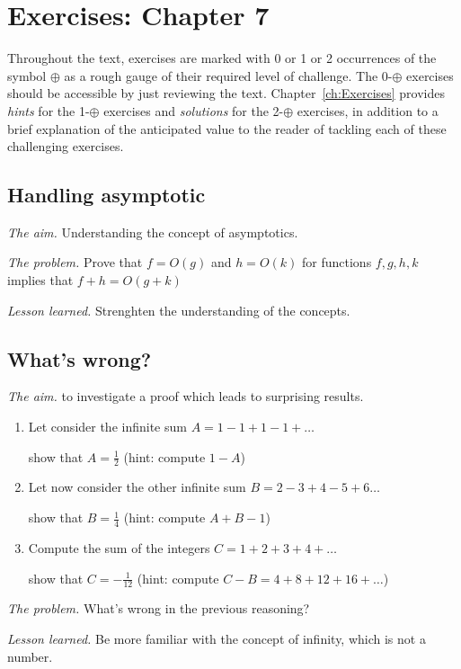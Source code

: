 
\section{Exercises: Chapter 7}

Throughout the text, exercises are marked with 0 or 1 or 2 occurrences
of the symbol $\oplus$ as a rough gauge of their required level of
 challenge.  The 0-$\oplus$ exercises should be accessible by just reviewing the text.
Chapter~\ref{ch:Exercises} provides {\em hints} for the 1-$\oplus$ exercises
and {\em solutions} for the 2-$\oplus$ exercises, in addition to a brief
explanation of the anticipated value to the reader of tackling each of these
challenging exercises.


\subsection{Handling asymptotic}

\noindent \textit{The aim.}
Understanding the concept of asymptotics.
\medskip

\noindent \textit{The problem.}
Prove that $f = O(g)$ and $h = O(k)$ for functions $f,g,h,k$ implies that
$f+h = O(g+k)$
\medskip

\noindent \textit{Lesson learned.}
Strenghten the understanding of the concepts. 


\subsection{What's wrong?}

\noindent \textit{The aim.}
to investigate a proof which leads to surprising results.

\begin{enumerate}
\item
Let consider the infinite sum $A = 1-1+1-1+ \ldots$

show that $A=\frac{1}{2}$ (hint: compute $1-A$)
\item
Let now consider the other infinite sum $B=2-3+4-5+6 \ldots$

show that $B=\frac{1}{4}$ (hint: compute $A+B-1$)
\item 
Compute the sum of the integers $C=1+2+3+4+ \ldots$

show that $C=-\frac{1}{12}$ (hint: compute $C-B=4+8+12+16+ \ldots$)
\end{enumerate}
\medskip

\noindent \textit{The problem.}
What's wrong in the previous reasoning?
\medskip

\noindent \textit{Lesson learned.}
Be more familiar with the concept of infinity, which is not a number.



